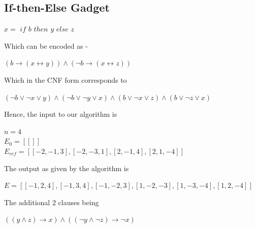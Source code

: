 \documentclass{article}
\theoremstyle{plain}
\begin{document}
\subsection{If-then-Else Gadget}
\begin{center}
$x = $ $if$ $b$ $then$ $y$ $else$ $z$
\end{center}
Which can be encoded as -
\begin{center}
$ (b \longrightarrow (x \longleftrightarrow y))  \wedge (\neg b \longrightarrow (x \longleftrightarrow z))$  
\end{center}
Which in the CNF form corresponds to
\begin{center}
$(\neg b \vee \neg x \vee y) \wedge (\neg b \vee \neg y \vee x) \wedge (b \vee \neg x \vee z) \wedge (b \vee \neg z \vee x)$
\end{center}
Hence, the input to our algorithm is
\begin{center}
$n = 4$\\
$E_0 = [[]]$ \\
$E_{ref} = [[-2,-1,3],[-2,-3,1],[2,-1,4],[2,1,-4]]$
\end{center}
The output as given by the algorithm is 
\begin{center}
$E = [[-1,2,4],[-1,3,4],[-1,-2,3],[1,-2,-3],[1,-3,-4],[1,2,-4]]$
\end{center}
The additional $2$ clauses being 
\begin{center}
$((y \wedge z) \longrightarrow x) \wedge ((\neg y \wedge \neg z) \longrightarrow \neg x)$
\end{center}
\end{document}
